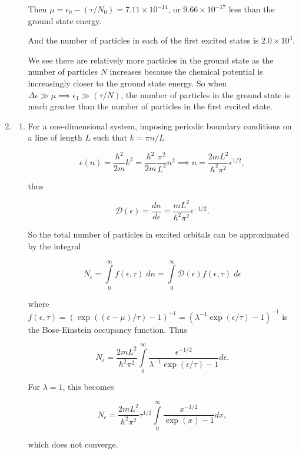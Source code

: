 \documentclass{article}
\begin{document}
\begin{enumerate}
\begin{enumerate}
		Then $\mu = \epsilon_0 - (\tau / N_0) = 7.11 \times 10^{-14}$, or $9.66 \times 10^{-17}$ less than the ground state energy.

		And the number of particles in each of the first excited states is $2.0 \times 10^3$.

		We see there are relatively more particles in the ground state as the number of particles $N$ increases because the chemical potential is increasingly closer to the ground state energy. So when $\Delta \epsilon \gg \mu \implies \epsilon_1 \gg (\tau / N)$, the number of particles in the ground state is much greater than the number of particles in the first excited state.

	\end{enumerate}

	\item

	\begin{enumerate}

		\item

		For a one-dimensional system, imposing periodic boundary conditions on a line of length $L$ such that $k = \pi n/ L$

		$$\epsilon(n) = \frac{\hbar^2}{2m}k^2 = \frac{\hbar^2}{2m} \frac{\pi^2}{L^2} n^2 \implies n = \frac{2mL^2}{\hbar^2\pi^2} \epsilon^{1/2},$$

		thus

		$$\mathcal{D}(\epsilon) = \frac{d n}{d\epsilon} = \frac{mL^2}{\hbar^2\pi^2} \epsilon^{-1/2}.$$

		So the total number of particles in excited orbitals can be approximated by the integral

		$$N_\epsilon = \int \limits_0^{\infty} f(\epsilon, \tau) \; dn = \int \limits_0^{\infty} \mathcal{D}(\epsilon) f(\epsilon, \tau) \; d\epsilon$$

		where $f(\epsilon, \tau) = (\exp((\epsilon - \mu) / \tau) - 1)^{-1} = (\lambda^{-1} \exp(\epsilon / \tau) - 1)^{-1}$ is the Bose-Einstein occupancy function. Thus

		$$N_\epsilon = \frac{2mL^2}{\hbar^2\pi^2} \int \limits_0^{\infty} \frac{\epsilon^{-1/2}}{\lambda^{-1} \exp(\epsilon / \tau) - 1} d\epsilon.$$

		For $\lambda = 1$, this becomes

		$$N_\epsilon = \frac{2mL^2}{\hbar^2\pi^2} \tau^{1/2} \int \limits_0^{\infty} \frac{x^{-1/2}}{\exp(x) - 1} dx,$$

		which does not converge.


\end{enumerate}
\end{enumerate}
\end{document}
